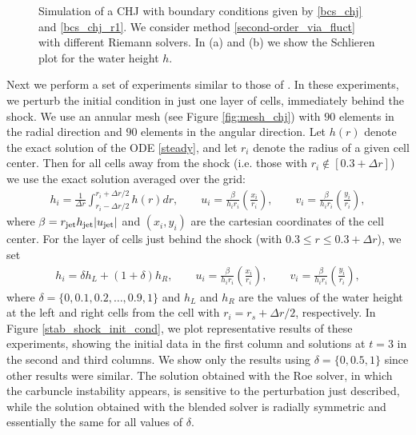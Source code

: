 \documentclass[preprint, 11pt]{article}
\newcommand{\jet}{{\textup{jet}}}
\begin{document}
\begin{figure}[!h]
{\begin{tabular}{c}
    \end{tabular}
  }
    \caption{Simulation of a CHJ with boundary conditions given by \eqref{bcs_chj} and \eqref{bcs_chj_r1}.    
      We consider method \eqref{second-order_via_fluct} with different Riemann solvers.
      In (a) and (b) we show the Schlieren plot for the water height $h$.
    \label{fig:chj_r1}}
\end{figure}

Next we perform a set of experiments similar to those of \cite[Section III B]{kitamura2009evaluation}.
In these experiments, we perturb the initial condition in just one layer of cells, immediately behind the shock.
We use an annular mesh (see Figure \ref{fig:mesh_chj}) with $90$ elements in
the radial direction and $90$ elements in the angular direction.  Let $h(r)$ denote the exact solution
of the ODE \eqref{steady}, and let $r_i$ denote the radius of a given cell center.  Then for all cells
away from the shock (i.e. those with $r_i \notin [0.3+\Delta r]$) we use the exact solution averaged over the grid:
\begin{align*}
  h_i = \frac{1}{\Delta r}\int_{r_i-\Delta r/2}^{r_i+\Delta r/2}h(r) dr,
  \qquad
  u_i = \frac{\beta}{h_ir_i}\left(\frac{x_i}{r_i}\right),
  \qquad
  v_i = \frac{\beta}{h_ir_i}\left(\frac{y_i}{r_i}\right),
\end{align*}
where $\beta=r_\jet h_\jet |u_\jet|$ and $(x_i,y_i)$ are the cartesian
coordinates of the cell center.  For the layer of cells just behind the shock (with $0.3 \le r \le 0.3+\Delta r$),
we set
\begin{align*}
  h_i = \delta h_{L} + (1+\delta) h_{R},
  \qquad
  u_i = \frac{\beta}{h_ir_i}\left(\frac{x_i}{r_i}\right),
  \qquad
  v_i = \frac{\beta}{h_ir_i}\left(\frac{y_i}{r_i}\right),
\end{align*}
where $\delta=\{0,0.1,0.2,\dots,0.9,1\}$ and $h_L$ and $h_R$ are the values of the water height
at the left and right cells from the cell with $r_i=r_s+\Delta r/2$, respectively.
In Figure \ref{stab_shock_init_cond}, we plot representative results of these experiments, showing
the initial data in the first column and solutions at $t=3$ in the second and third columns.
We show only the results using $\delta=\{0,0.5,1\}$ since other results were similar.
The solution obtained with the Roe solver, in which the carbuncle instability appears,
is sensitive to the perturbation just described, while the solution obtained with the
blended solver is radially symmetric and essentially the same for all values of $\delta$.
\end{document}
